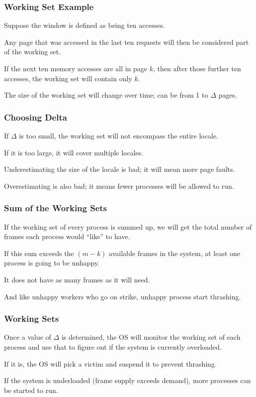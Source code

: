 \begin{frame}
\frametitle{Working Set Example}

Suppose the window is defined as being ten accesses. 

Any page that was accessed in the last ten requests will then be considered part of the working set. 

If the next ten memory accesses are all in page $k$, then after those further ten accesses, the working set will contain only $k$. 

The size of the working set will change over time; can be from 1 to $\Delta$ pages.

\end{frame}

\begin{frame}
\frametitle{Choosing Delta}

If $\Delta$ is too small, the working set will not encompass the entire locale. 

If it is too large, it will cover multiple locales. 

Underestimating the size of the locale is bad; it will mean more page faults.


Overestimating is also bad; it means fewer processes will be allowed to run.

\end{frame}

\begin{frame}
\frametitle{Sum of the Working Sets}

If the working set of every process is summed up, we will get the total number of frames each process would ``like'' to have. 

If this sum exceeds the $(m-k)$ available frames in the system, at least one process is going to be unhappy.

It does not have as many frames as it will need. 

And like unhappy workers who go on strike, unhappy process start thrashing.


\end{frame}

\begin{frame}
\frametitle{Working Sets}

Once a value of $\Delta$ is determined, the OS will monitor the working set of each process and use that to figure out if the system is currently overloaded. 

If it is, the OS will pick a victim and suspend it to prevent thrashing. 

If the system is underloaded (frame supply exceeds demand), more processes can be started to run.


\end{frame}

